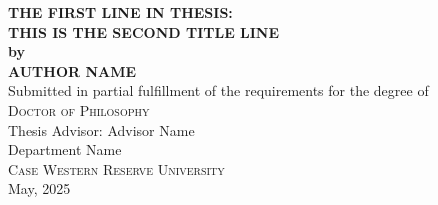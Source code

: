 \documentclass[12pt, oneside]{book}
\begin{document}


\begin{titlepage}
\begin{center}
\Large{\bfseries\MakeUppercase{
    The First Line in Thesis:\\ This is the Second Title Line\\
 }}
 \vspace{.5cm}
 \large{\bfseries{by}}\\ \vspace{.5cm}
 \vspace{.5cm}
\Large{\bfseries\MakeUppercase{Author Name}}\\[5pt]

\vspace{2cm}
\large{Submitted in partial fulfillment of the requirements for the degree of} \\[0.5cm]
\textsc{\Large{{Doctor of Philosophy}}} \\[5pt]
\vfill
{Thesis Advisor: Advisor Name} \vspace{0.4cm} \\[2cm]

 \vfill
\large{Department Name}\\[5pt]
\textsc{Case Western Reserve University}\\[0.5cm]

{May, 2025}
\end{center}
\end{titlepage}
\end{document}
